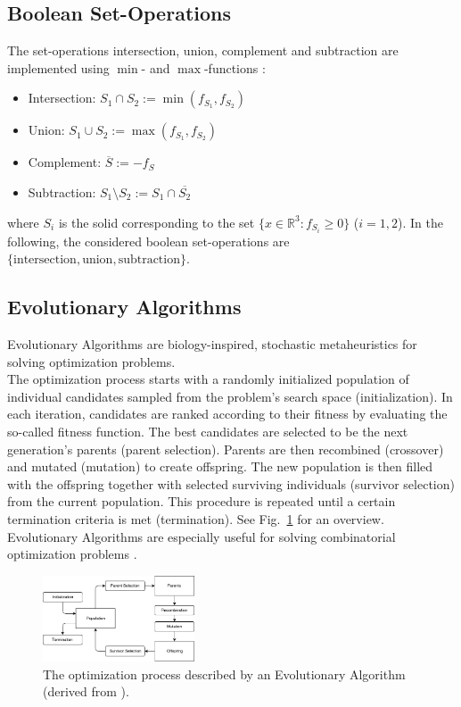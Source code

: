 \subsection{Boolean Set-Operations}
The set-operations intersection, union, complement and subtraction are implemented using $\min$- and $\max$-functions \cite{ricci197constgeo}: 
\begin{itemize}
	\item Intersection: $S_1 \cap S_2 := \min(f_{S_1}, f_{S_2})$
	\item Union: $S_1 \cup S_2 := \max(f_{S_1}, f_{S_2})$
	\item Complement: $\overline{S} := -f_S$ %
	\item Subtraction: $S_1 \setminus S_2 := S_1 \cap \overline{S_2}$%
\end{itemize}
where $S_i$ is the solid corresponding to the set $\{x \in \mathbb{R}^3: f_{S_i} \geq 0\}$ ($i=1,2$).
In the following, the considered boolean set-operations are $\{\text{intersection}, \text{union}, \text{subtraction}\}$.
\subsection{Evolutionary Algorithms} 
Evolutionary Algorithms are biology-inspired, stochastic metaheuristics for solving optimization problems.
\\
The optimization process starts with a randomly initialized population of individual candidates sampled from the problem's search space (initialization).
In each iteration, candidates are ranked according to their fitness by evaluating the so-called fitness function.
The best candidates are selected to be the next generation's parents (parent selection).
Parents are then recombined (crossover) and mutated (mutation) to create offspring. 
The new population is then filled with the offspring together with selected surviving individuals (survivor selection) from the current population.
This procedure is repeated until a certain termination criteria is met (termination). 
See Fig.~\ref{fig:evo} for an overview.
\\
Evolutionary Algorithms are especially useful for solving combinatorial optimization problems \cite{eiben2003introduction}.
\begin{figure}[htb]
	\centering
	\includegraphics[width=0.4\textwidth]{figures/evo.pdf}
	\caption{The optimization process described by an Evolutionary Algorithm (derived from \cite{eiben2003introduction}).}
	\label{fig:evo}
\end{figure}
